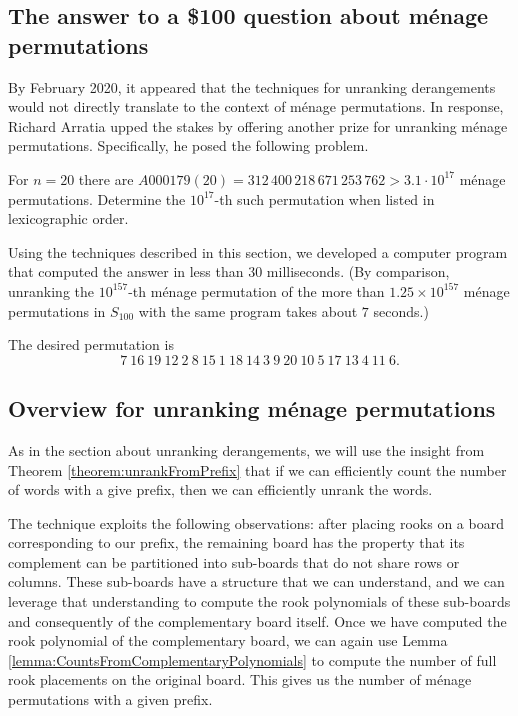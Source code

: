\subsection{The answer to a \$100 question about m\'enage permutations}
By February 2020, it appeared that the techniques for unranking derangements
would not directly translate to the context of m\'enage permutations. In
response, Richard Arratia upped the stakes by offering another prize for
unranking m\'enage permutations. Specifically, he posed the following problem.
\begin{problem}
  For $n=20$ there are $A000179(20) = 312\,400\,218\,671\,253\,762 > 3.1\cdot 10^{17}$
  m\'enage permutations.
  Determine the $10^{17}$-th such permutation when listed in lexicographic order.
\end{problem}
Using the techniques described in this section, we developed a computer program that
computed the answer in less than $30$ milliseconds.
(By comparison, unranking the $10^{157}$-th m\'enage permutation of the more
than $1.25 \times 10^{157}$ m\'enage permutations in $S_{100}$
with the same program takes about $7$ seconds.)
\begin{answer}
  The desired permutation is \begin{equation}
    7\ 16\ 19\ 12\ 2\ 8\ 15\ 1\ 18\ 14\ 3\ 9\ 20\ 10\ 5\ 17\ 13\ 4\ 11\ 6.
  \end{equation}
\end{answer}

\subsection{Overview for unranking m\'enage permutations}

As in the section about unranking derangements, we will use the insight from
Theorem \ref{theorem:unrankFromPrefix} that if we can efficiently count the number
of words with a give prefix, then we can efficiently unrank the words.

The technique exploits the following observations:
after placing rooks on a board corresponding to our
prefix, the remaining board has the property that its complement
can be partitioned into sub-boards that do not share rows or columns.
These sub-boards have a structure that we can understand,
and we can leverage that understanding to compute the rook polynomials of these
sub-boards and consequently of the complementary board itself. Once we have computed
the rook polynomial of the complementary board, we can again use
Lemma \ref{lemma:CountsFromComplementaryPolynomials}
to compute the number of full rook placements on the original board.
This gives us the number of m\'enage permutations with a given prefix.

